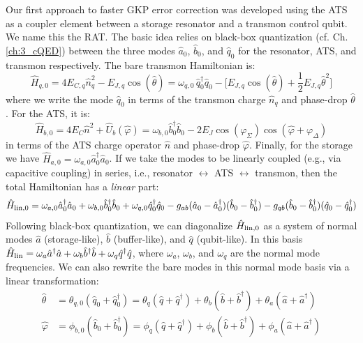 Our first approach to faster GKP error correction was developed using the ATS as a coupler element between a storage resonator and a transmon control qubit. We name this the RAT. The basic idea relies on black-box quantization (cf. Ch. \ref{ch:3_cQED}) between the three modes $\hat{a}_0$, $\hat{b}_0$, and $\hat{q}_0$ for the resonator, ATS, and transmon respectively. The bare transmon Hamiltonian is:
\begin{equation}
\hat{H}_{q, 0} = 4E_{C,q}\hat{n}_q^2 - E_{J,q}\cos(\hat{\theta}) = \omega_{q,0}\,\hat{q}_0^\dagger \hat{q}_0 - \Big[E_{J,q}\cos(\hat{\theta}) + \frac{1}{2}E_{J,q} \hat{\theta}^2\Big] 
\end{equation}
where we write the mode $\hat{q}_0$ in terms of the transmon charge $\hat{n}_q$ and phase-drop $\hat{\theta}$. For the ATS, it is:
\begin{equation}
\hat{H}_{b,0} = 4E_C \hat{n}^2 + \hat{U}_b(\hat{\varphi}) = \omega_{b,0}\hat{b}_0^\dagger \hat{b}_0 - 2E_J \cos(\varphi_\Sigma)\cos(\hat{\varphi} + \varphi_\Delta)
\end{equation}
in terms of the ATS charge operator $\hat{n}$ and phase-drop $\hat{\varphi}$. Finally, for the storage we have $\hat{H}_{a, 0} = \omega_{a,0}\hat{a}_0^\dagger \hat{a}_0$. If we take the modes to be linearly coupled (e.g., via capacitive coupling) in series, i.e., resonator $\leftrightarrow$ ATS $\leftrightarrow$ transmon, then the total Hamiltonian has a \textit{linear} part:
\begin{equation}
\hat{H}_{\rm lin, 0} = \omega_{a,0}\hat{a}_0^\dagger \hat{a}_0 + \omega_{b,0}\hat{b}_0^\dagger \hat{b}_0 + \omega_{q,0}\hat{q}_0^\dagger \hat{q}_0 - g_{ab}(\hat{a}_0 - \hat{a}_0^\dagger)(\hat{b}_0 - \hat{b}_0^\dagger) - g_{qb}(\hat{b}_0 - \hat{b}_0^\dagger)(\hat{q}_0 - \hat{q}_0^\dagger)
\end{equation}
Following black-box quantization, we can diagonalize $\hat{H}_{\rm lin, 0}$ as a system of normal modes $\hat{a}$ (storage-like), $\hat{b}$ (buffer-like), and $\hat{q}$ (qubit-like). In this basis $\hat{H}_{\rm lin} = \omega_a \hat{a}^\dagger\hat{a} + \omega_b \hat{b}^\dagger\hat{b} + \omega_q \hat{q}^\dagger\hat{q}$, where $\omega_a$, $\omega_b$, and $\omega_q$ are the normal mode frequencies. We can also rewrite the bare modes in this normal mode basis via a linear transformation:
\begin{align}
\hat{\theta} &= \theta_{q, 0}(\hat{q}_0 + \hat{q}_0^\dagger) = \theta_q(\hat{q} + \hat{q}^\dagger) + \theta_b(\hat{b} + \hat{b}^\dagger) + \theta_a(\hat{a} + \hat{a}^\dagger) \\
\hat{\varphi} &= \phi_{b, 0}(\hat{b}_0 + \hat{b}_0^\dagger) = \phi_q(\hat{q} + \hat{q}^\dagger) + \phi_b(\hat{b} + \hat{b}^\dagger) + \phi_a(\hat{a} + \hat{a}^\dagger)
\label{eq:linear_basis_RAT_RAF}
\end{align}
